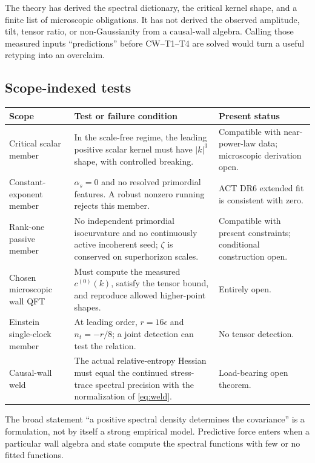\documentclass[11pt]{article}
\numberwithin{equation}{section}
\newcommand{\cz}{c^{(0)}}
\theoremstyle{definition}
\theoremstyle{remark}
\begin{document}
\begin{warningbox}
The theory has derived the spectral dictionary, the critical kernel shape, and a finite list of microscopic obligations. It has not derived the observed amplitude, tilt, tensor ratio, or non-Gaussianity from a causal-wall algebra. Calling those measured inputs ``predictions'' before CW--T1--T4 are solved would turn a useful retyping into an overclaim.
\end{warningbox}

\subsection{Scope-indexed tests}

\begin{center}
\begin{tabularx}{0.98\textwidth}{@{}p{}Yp{0.19\textwidth}@{}}
\toprule
\textbf{Scope} & \textbf{Test or failure condition} & \textbf{Present status}\\
\midrule
Critical scalar member & In the scale-free regime, the leading positive scalar kernel must have $|k|^3$ shape, with controlled breaking. & Compatible with near-power-law data; microscopic derivation open.\\
Constant-exponent member & $\alpha_s=0$ and no resolved primordial features. A robust nonzero running rejects this member. & ACT DR6 extended fit is consistent with zero.\\
Rank-one passive member & No independent primordial isocurvature and no continuously active incoherent seed; $\zeta$ is conserved on superhorizon scales. & Compatible with present constraints; conditional construction open.\\
Chosen microscopic wall QFT & Must compute the measured $\cz(k)$, satisfy the tensor bound, and reproduce allowed higher-point shapes. & Entirely open.\\
Einstein single-clock member & At leading order, $r=16\epsilon$ and $n_t=-r/8$; a joint detection can test the relation. & No tensor detection.\\
Causal-wall weld & The actual relative-entropy Hessian must equal the continued stress-trace spectral precision with the normalization of \cref{eq:weld}. & Load-bearing open theorem.\\
\bottomrule
\end{tabularx}
\end{center}

The broad statement ``a positive spectral density determines the covariance'' is a formulation, not by itself a strong empirical model. Predictive force enters when a particular wall algebra and state compute the spectral functions with few or no fitted functions.
\end{document}
